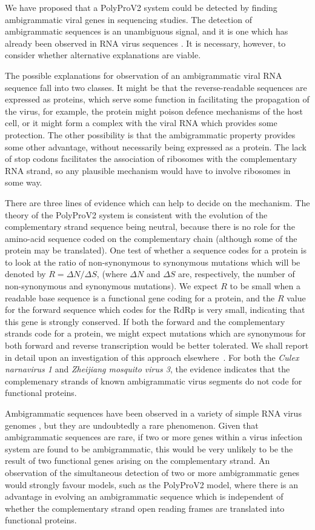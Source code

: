 \documentclass[12pt]{iopart}
\begin{document}
 We have proposed that a PolyProV2 system could be detected by finding ambigrammatic viral genes 
 in sequencing studies. The detection of ambigrammatic sequences is an unambiguous 
 signal, and it is one which has already been observed in RNA virus sequences
 \cite{Cook2013,DeR+19,Cep20,Bat+20,Ret+20,Dudas2021}. It is necessary, however, 
 to consider whether alternative explanations are viable. 
 
 The possible explanations for observation of an ambigrammatic viral RNA sequence fall into 
 two classes. It might be that the reverse-readable sequences are expressed as proteins, which 
 serve some function in facilitating the propagation of the virus, for example, the protein 
 might poison defence mechanisms of the host cell, or it might form a complex with the viral 
 RNA which provides some protection. The other possibility is that the ambigrammatic property 
 provides some other advantage, without necessarily being expressed as a protein. The lack of stop codons 
 facilitates the association of ribosomes with the complementary RNA strand, so any plausible 
 mechanism would have to involve ribosomes in some way.  

There are three lines of evidence which can help to decide on the mechanism. The theory of the PolyProV2 
system is consistent with the evolution of the complementary strand sequence being neutral, because there 
is no role for the amino-acid sequence coded on the complementary chain (although some of the 
protein may be translated). One test of whether a sequence codes for a protein is to look at the 
ratio of non-synonymous to synonymous mutations which will be denoted by $R=\Delta N/\Delta S$, 
(where $\Delta N$ and $\Delta S$ are, respectively, the number of non-synonymous and synonymous mutations). 
We expect $R$ to be small when a readable base sequence is a functional gene coding for a protein, 
and the $R$ value for the forward sequence which codes for the RdRp is very small, indicating 
that this gene is strongly conserved. If both the forward and the complementary strands 
code for a protein, we might expect mutations which are synonymous for both forward and 
reverse transcription would be better tolerated. We shall report in detail upon
an investigation of this approach elsewhere~\cite{Dudas2021}. For both the 
\emph{Culex narnavirus 1} and \emph{Zheijiang mosquito virus 3}, the evidence indicates
that the complemenary strands of known ambigrammatic virus segments do not code for functional 
proteins.

Ambigrammatic sequences have been observed in a variety of simple RNA virus genomes
\cite{Cook2013,DeR+19,Cep20,Bat+20,Ret+20,Dudas2021}, 
but they are undoubtedly a rare phenomenon. Given that ambigrammatic sequences are rare, if 
two or more genes within a virus infection system are found to be ambigrammatic, this would be 
very unlikely to be the result of two functional genes arising on the complementary strand. 
An observation of the simultaneous detection of two or more ambigrammatic genes would 
strongly favour models, such as the PolyProV2 model, where there is an advantage in evolving an 
ambigrammatic sequence which is independent of whether the complementary strand open reading 
frames are translated into functional proteins.
\end{document}
